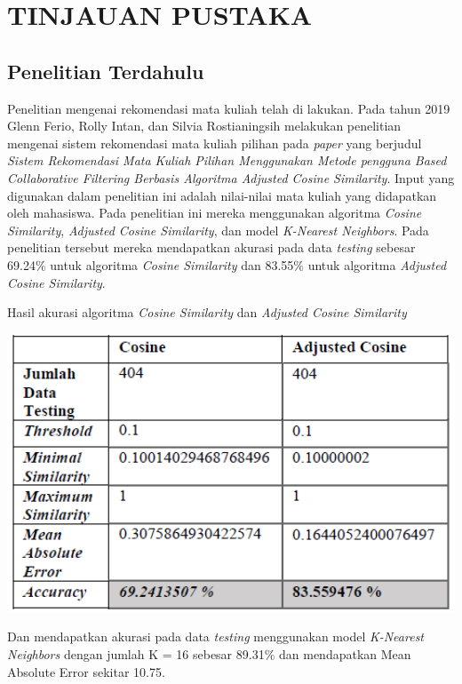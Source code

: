 \chapter{TINJAUAN PUSTAKA}

\section{Penelitian Terdahulu}
Penelitian mengenai rekomendasi mata kuliah telah di lakukan. Pada tahun 2019 Glenn Ferio, Rolly Intan, dan Silvia Rostianingsih melakukan
penelitian mengenai sistem rekomendasi mata kuliah pilihan pada \emph{paper} yang berjudul
\emph{Sistem Rekomendasi Mata Kuliah Pilihan Menggunakan Metode pengguna Based Collaborative Filtering Berbasis Algoritma Adjusted Cosine Similarity}.
Input yang digunakan dalam penelitian ini adalah nilai-nilai mata kuliah yang didapatkan oleh mahasiswa. Pada penelitian ini mereka menggunakan algoritma
\emph{Cosine Similarity}, \emph{Adjusted Cosine Similarity}, dan model \emph{K-Nearest Neighbors}. Pada penelitian tersebut mereka mendapatkan akurasi
pada data \emph{testing} sebesar 69.24\% untuk algoritma \emph{Cosine Similarity} dan 83.55\% untuk algoritma \emph{Adjusted Cosine Similarity}.

\begin{table} [ht] \centering
  \caption{Hasil akurasi algoritma \emph{Cosine Similarity} dan \emph{Adjusted Cosine Similarity} \citep{cosineSimilarity}}
  \vspace*{2mm}
  \includegraphics[width=160mm]{gambar/akurasi-algoritma-cosine-similarity.png}
\end{table}

Dan mendapatkan akurasi pada data \emph{testing} menggunakan model \emph{K-Nearest Neighbors} dengan jumlah K = 16 sebesar 89.31\%
dan mendapatkan Mean Absolute Error sekitar 10.75.
\newpage


